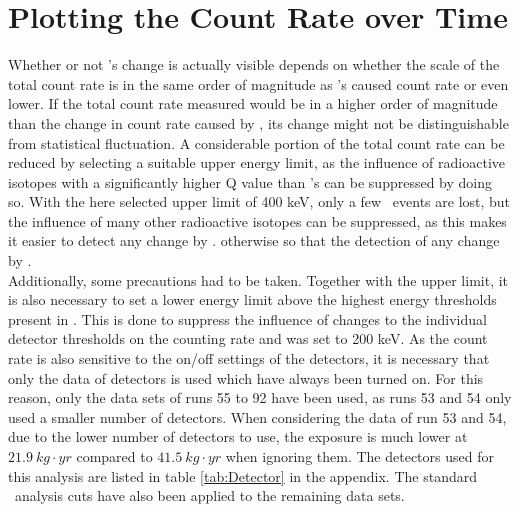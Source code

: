 \documentclass[encoding=utf8,british]{tumphthesis}
\begin{document}
\section{Plotting the Count Rate over Time}
\label{sec:plotting}

Whether or not \Kr's change is actually visible depends on whether the scale of the total count rate is in the same order of magnitude as \Kr's caused count rate or even lower.
If the total count rate measured would be in a higher order of magnitude than the change in count rate caused by \Kr, its change might not be distinguishable from statistical fluctuation.
A considerable portion of the total count rate can be reduced by selecting a suitable upper energy limit, as the influence of radioactive isotopes with a significantly higher Q value than \Kr's can be suppressed by doing so.
With the here selected upper limit of 400 keV, only a few \Kr\ events are lost, but the influence of many other radioactive isotopes can be suppressed, as this makes it easier to detect any change by \Kr. otherwise so that the detection of any change by \Kr.
\\

Additionally, some precautions had to be taken.
Together with the upper limit, it is also necessary to set a lower energy limit above the highest energy thresholds present in \PII.
This is done to suppress the influence of changes to the individual detector thresholds on the counting rate and was set to 200 keV.
As the count rate is also sensitive to the on/off settings of the detectors, it is necessary that only the data of detectors is used which have always been turned on.
For this reason, only the data sets of runs 55 to 92 have been used, as runs 53 and 54 only used a smaller number of detectors.
When considering the data of run 53 and 54, due to the lower number of detectors to use, the exposure is much lower at $21.9 \ \unit{kg}\cdot\unit{yr}$ compared to $41.5 \ \unit{kg}\cdot\unit{yr}$ when ignoring them.
The detectors used for this analysis are listed in table \ref{tab:Detector} in the appendix.
The standard \gerda\ analysis cuts have also been applied to the remaining data sets.
\\
\end{document}
